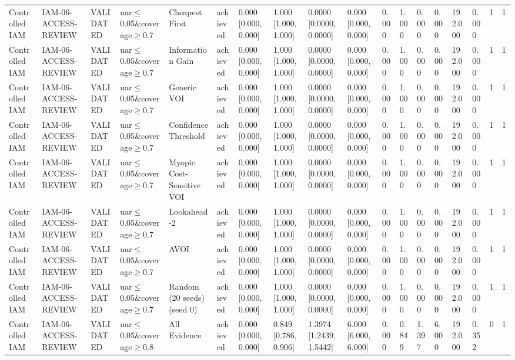 \begin{table}[!ht]
{\begin{tabular}{llllllllllllllllll}
Controlled IAM & IAM-06-ACCESS-REVIEW & VALIDATED & uar$\le$0.05\&coverage$\ge$0.7 & Cheapest First & achieved & 0.000 [0.000, 0.000] & 1.000 [1.000, 1.000] & 0.0000 [0.0000, 0.0000] & 0.000 [0.000, 0.000] & 0.000 & 1.000 & 0.000 & 0.000 & 192.000 & 0.000 & 1 & 1 \\
Controlled IAM & IAM-06-ACCESS-REVIEW & VALIDATED & uar$\le$0.05\&coverage$\ge$0.7 & Information Gain & achieved & 0.000 [0.000, 0.000] & 1.000 [1.000, 1.000] & 0.0000 [0.0000, 0.0000] & 0.000 [0.000, 0.000] & 0.000 & 1.000 & 0.000 & 0.000 & 192.000 & 0.000 & 1 & 1 \\
Controlled IAM & IAM-06-ACCESS-REVIEW & VALIDATED & uar$\le$0.05\&coverage$\ge$0.7 & Generic VOI & achieved & 0.000 [0.000, 0.000] & 1.000 [1.000, 1.000] & 0.0000 [0.0000, 0.0000] & 0.000 [0.000, 0.000] & 0.000 & 1.000 & 0.000 & 0.000 & 192.000 & 0.000 & 1 & 1 \\
Controlled IAM & IAM-06-ACCESS-REVIEW & VALIDATED & uar$\le$0.05\&coverage$\ge$0.7 & Confidence Threshold & achieved & 0.000 [0.000, 0.000] & 1.000 [1.000, 1.000] & 0.0000 [0.0000, 0.0000] & 0.000 [0.000, 0.000] & 0.000 & 1.000 & 0.000 & 0.000 & 192.000 & 0.000 & 1 & 1 \\
Controlled IAM & IAM-06-ACCESS-REVIEW & VALIDATED & uar$\le$0.05\&coverage$\ge$0.7 & Myopic Cost-Sensitive VOI & achieved & 0.000 [0.000, 0.000] & 1.000 [1.000, 1.000] & 0.0000 [0.0000, 0.0000] & 0.000 [0.000, 0.000] & 0.000 & 1.000 & 0.000 & 0.000 & 192.000 & 0.000 & 1 & 1 \\
Controlled IAM & IAM-06-ACCESS-REVIEW & VALIDATED & uar$\le$0.05\&coverage$\ge$0.7 & Lookahead-2 & achieved & 0.000 [0.000, 0.000] & 1.000 [1.000, 1.000] & 0.0000 [0.0000, 0.0000] & 0.000 [0.000, 0.000] & 0.000 & 1.000 & 0.000 & 0.000 & 192.000 & 0.000 & 1 & 1 \\
Controlled IAM & IAM-06-ACCESS-REVIEW & VALIDATED & uar$\le$0.05\&coverage$\ge$0.7 & AVOI & achieved & 0.000 [0.000, 0.000] & 1.000 [1.000, 1.000] & 0.0000 [0.0000, 0.0000] & 0.000 [0.000, 0.000] & 0.000 & 1.000 & 0.000 & 0.000 & 192.000 & 0.000 & 1 & 1 \\
Controlled IAM & IAM-06-ACCESS-REVIEW & VALIDATED & uar$\le$0.05\&coverage$\ge$0.7 & Random (20 seeds) (seed 0) & achieved & 0.000 [0.000, 0.000] & 1.000 [1.000, 1.000] & 0.0000 [0.0000, 0.0000] & 0.000 [0.000, 0.000] & 0.000 & 1.000 & 0.000 & 0.000 & 192.000 & 0.000 & 1 & 1 \\
Controlled IAM & IAM-06-ACCESS-REVIEW & VALIDATED & uar$\le$0.05\&coverage$\ge$0.8 & All Evidence & achieved & 0.000 [0.000, 0.000] & 0.849 [0.786, 0.906] & 1.3974 [1.2439, 1.5442] & 6.000 [6.000, 6.000] & 0.000 & 0.849 & 1.397 & 6.000 & 192.000 & 0.352 & 0 & 1 \\

\end{tabular}}
\end{table}
